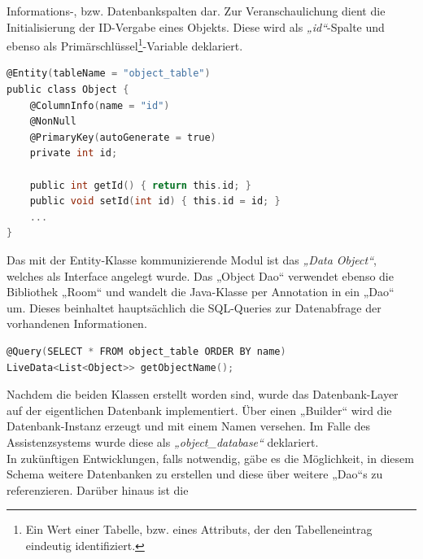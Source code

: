 Informations-, bzw. Datenbankspalten dar. Zur Veranschaulichung dient die Initialisierung der \acs{ID}-Vergabe eines Objekts. Diese wird als \textit{„id“}-Spalte 
und ebenso als Primärschlüssel\footnote{Ein Wert einer Tabelle, bzw. eines Attributs, der den Tabelleneintrag eindeutig identifiziert.}-Variable 
deklariert.
\\ 
\begin{lstlisting}[language=C,
    frame=lines,           % Ein Rahmen um den Code (single for box, lines for top and bottom)
    xleftmargin=\parindent,  % Rahmen link von den Zahlen
    style=algoBericht,
    label={code:entity},
    captionpos=b,           % Caption unter den Code setzen
caption={Entity Code zur Initialisierung der Objekte}]
@Entity(tableName = "object_table")
public class Object {
    @ColumnInfo(name = "id")
    @NonNull
    @PrimaryKey(autoGenerate = true)
    private int id;

    public int getId() { return this.id; }
    public void setId(int id) { this.id = id; }
    ... 
}
\end{lstlisting}
\pagebreak
Das mit der Entity-Klasse kommunizierende Modul ist das \textit{„Data Object“}, welches als Interface angelegt wurde. Das „Object Dao“ verwendet ebenso die Bibliothek 
„Room“ und wandelt die Java-Klasse per Annotation in ein „Dao“ um. Dieses beinhaltet hauptsächlich die SQL-Queries zur Datenabfrage der vorhandenen Informationen. 
\\
\begin{lstlisting}[language=C,
    frame=lines,           % Ein Rahmen um den Code (single for box, lines for top and bottom)
    xleftmargin=\parindent,  % Rahmen link von den Zahlen
    style=algoBericht,
    label={code:query},
    captionpos=b,           % Caption unter den Code setzen
caption={SQL-Query zur Abfrage der Objekt-Namen}]
@Query(SELECT * FROM object_table ORDER BY name)
LiveData<List<Object>> getObjectName();
\end{lstlisting}
Nachdem die beiden Klassen erstellt worden sind, wurde das Datenbank-Layer auf der eigentlichen Datenbank implementiert. Über einen „Builder“ wird die 
Datenbank-Instanz erzeugt und mit einem Namen versehen. Im Falle des Assistenzsystems wurde diese als \textit{„object\_database“} deklariert. 
\\ 
In zukünftigen Entwicklungen, 
falls notwendig, gäbe es die Möglichkeit, in diesem Schema weitere Datenbanken zu erstellen und diese über weitere „Dao“s zu referenzieren. Darüber hinaus ist die 
